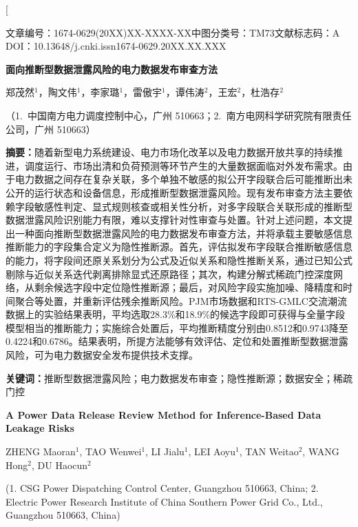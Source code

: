\documentclass[UTF8,zihao=5,twoside,fontset=none]{ctexart}
\newcommand{\articleinfo}{文章编号：1674-0629(20XX)XX-XXXX-XX\quad 中图分类号：TM73\quad 文献标志码：A\\
DOI：10.13648/j.cnki.issn1674-0629.20XX.XX.XXX}
\begin{document}
\twocolumn[

\begin{center}
{\articleinfo}\par\vspace{1.0em}
{\sffamily{}\bfseries 面向推断型数据泄露风险的电力数据发布审查方法}\par\vspace{0.8em}
{郑茂然$^{1}$，陶文伟$^{1}$，李家璐$^{1}$，雷傲宇$^{1}$，谭伟涛$^{2}$，王宏$^{2}$，杜浩存$^{2}$}\par\vspace{0.4em}
{（1.~中国南方电力调度控制中心，广州 510663；2.~南方电网科学研究院有限责任公司，广州 510663）}\par\vspace{0.8em}
\end{center}

\noindent\textbf{摘要：}随着新型电力系统建设、电力市场化改革以及电力数据开放共享的持续推进，调度运行、市场出清和负荷预测等环节产生的大量数据面临对外发布需求。由于电力数据之间存在复杂关联，多个单独不敏感的拟公开字段联合后可能推断出未公开的运行状态和设备信息，形成推断型数据泄露风险。现有发布审查方法主要依赖字段敏感性判定、显式规则核查或相关性分析，对多字段联合关联形成的推断型数据泄露风险识别能力有限，难以支撑针对性审查与处置。针对上述问题，本文提出一种面向推断型数据泄露风险的电力数据发布审查方法，并将承载主要敏感信息推断能力的字段集合定义为隐性推断源。首先，评估拟发布字段联合推断敏感信息的能力，将字段间还原关系划分为公式及近似关系和隐性推断关系，通过已知公式剔除与近似关系迭代剥离排除显式还原路径；其次，构建分解式稀疏门控深度网络，从剩余候选字段中定位隐性推断源；最后，对风险字段实施加噪、降精度和时间聚合等处置，并重新评估残余推断风险。PJM市场数据和RTS-GMLC交流潮流数据上的实验结果表明，平均选取28.3\%和18.9\%的候选字段即可获得与全量字段模型相当的推断能力；实施综合处置后，平均推断精度分别由0.8512和0.9743降至0.4224和0.6786。结果表明，所提方法能够有效评估、定位和处置推断型数据泄露风险，可为电力数据安全发布提供技术支撑。\par
\noindent\textbf{关键词：}推断型数据泄露风险；电力数据发布审查；隐性推断源；数据安全；稀疏门控\par\vspace{0.8em}

\begin{center}
{\bfseries\large A Power Data Release Review Method for Inference-Based Data Leakage Risks}\par\vspace{0.5em}
{ZHENG Maoran$^{1}$, TAO Wenwei$^{1}$, LI Jialu$^{1}$, LEI Aoyu$^{1}$, TAN Weitao$^{2}$, WANG Hong$^{2}$, DU Haocun$^{2}$}\par\vspace{0.3em}
{\small (1. CSG Power Dispatching Control Center, Guangzhou 510663, China; 2. Electric Power Research Institute of China Southern Power Grid Co., Ltd., Guangzhou 510663, China)}\par\vspace{0.5em}
\end{center}
\end{document}
